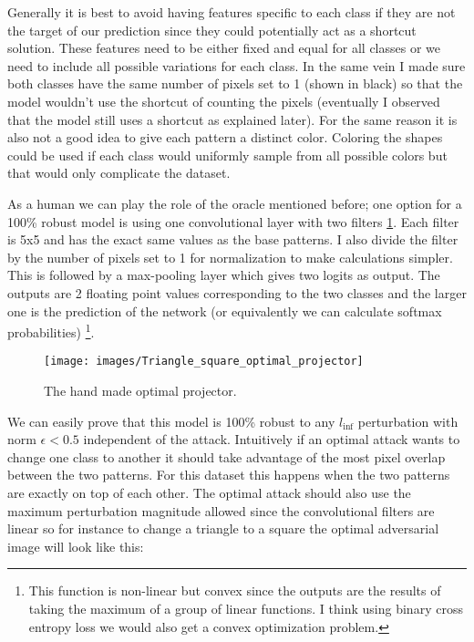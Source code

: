 \documentclass[../thesis.tex]{subfiles}
\begin{document}
	Generally it is best to avoid having features specific to each class if they are not the target of our prediction since they could potentially act as a shortcut solution. These features need to be either fixed and equal for all classes or we need to include all possible variations for each class. In the same vein I made sure both classes have the same number of pixels set to 1 (shown in black) so that the model wouldn't use the shortcut of counting the pixels (eventually I observed that the model still uses a shortcut as explained later). For the same reason it is also not a good idea to give each pattern a distinct color. Coloring the shapes could be used if each class would uniformly sample from all possible colors but that would only complicate the dataset. 
	
	As a human we can play the role of the oracle mentioned before; one option for a 100\% robust model is using one convolutional layer with two filters \ref{fig:trianglesquareoptimalprojector}. Each filter is 5x5 and has the exact same values as the base patterns. I also divide the filter by the number of pixels set to 1 for normalization to make calculations simpler. This is followed by a max-pooling layer which gives two logits as output. The outputs are 2 floating point values corresponding to the two classes and the larger one is the prediction of the network (or equivalently we can calculate softmax probabilities) \footnote{This function is non-linear but convex since the outputs are the results of taking the maximum of a group of linear functions. I think using binary cross entropy loss we would also get a convex optimization problem.}. 
	
	
	
	\begin{figure} %
		\centering
		\texttt{[image: images/Triangle\_square\_optimal\_projector]}
		\caption{The hand made optimal projector.}
		\label{fig:trianglesquareoptimalprojector}
	\end{figure}
	
	We can easily prove that this model is 100\% robust to any $l_{\inf}$ perturbation with norm $\epsilon < 0.5$ independent of the attack. Intuitively if an optimal attack wants to change one class to another it should take advantage of the most pixel overlap between the two patterns. For this dataset this happens when the two patterns are exactly on top of each other. The optimal attack should also use the maximum perturbation magnitude allowed since the convolutional filters are linear so for instance to change a triangle to a square the optimal adversarial image will look like this:
	
\end{document}

